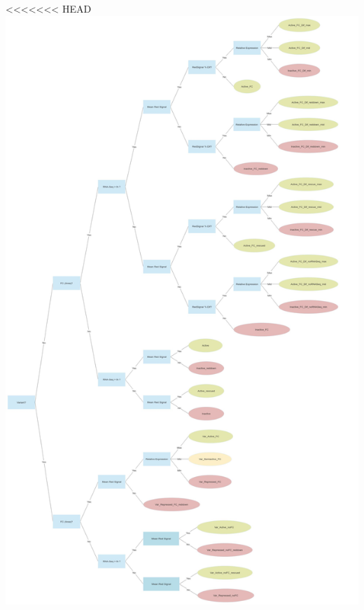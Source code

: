 \documentclass[11pt]{article}
\begin{document}
\begin{center}
<<<<<<< HEAD
\includegraphics[width=.9\linewidth]{./Plots/decision_tree.jpg}
\end{center}
\end{document}
